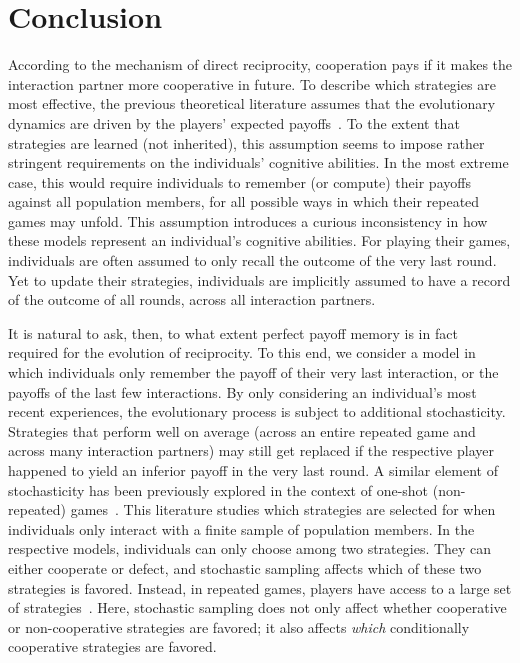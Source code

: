 \documentclass[11pt]{article}
\theoremstyle{plainCl1}
\theoremstyle{plainCl2}
\begin{document}


\section{Conclusion}\label{section:Conclusion}

According to the mechanism of direct reciprocity, cooperation pays if it makes the interaction partner more cooperative in future. 
To describe which strategies are most effective, the previous theoretical literature assumes that the evolutionary dynamics are driven by the players' expected payoffs~\citep{brauchli:JTB:1999,brandt:JTB:2006,ohtsuki:JTB:2007b,szolnoki:pre:2009b,imhof2010stochastic,van-segbroeck:prl:2012,grujic:jtb:2012,Martinez2012,stewart:pnas:2013,pinheiro:PLoSCB:2014,stewart:games:2015,Baek2016,McAvoy:ProcA:2019,glynatsi:SCR:2020,Schmid:PlosCB:2022,Murase:SciRep:2022}.
To the extent that strategies are learned (not inherited), this assumption seems to impose rather stringent requirements on the individuals' cognitive abilities. 
In the most extreme case, this would require individuals to remember (or compute) their payoffs against all population members, for all possible ways in which their repeated games may unfold. 
This assumption introduces a curious inconsistency in how these models represent an individual's cognitive abilities. 
For playing their games, individuals are often assumed to only recall the outcome of the very last round. 
Yet to update their strategies, individuals are implicitly assumed to have a record of the outcome of all rounds, across all interaction partners. 

It is natural to ask, then, to what extent perfect payoff memory is in fact required for the evolution of reciprocity. 
To this end, we consider a model in which individuals only remember the payoff of their very last interaction, or the payoffs of the last few interactions. 
By only considering an individual's most recent experiences, the evolutionary process is subject to additional stochasticity. 
Strategies that perform well on average (across an entire repeated game and across many interaction partners) may still get replaced if the respective player happened to yield an inferior payoff in the very last round. 
A similar element of stochasticity has been previously explored in the context of one-shot (non-repeated) games~\citep{sanchez:JTB:2005,roca:PhysicalReview:2006,Traulsen:JTB:2007,Woelfing:JTB:2009,Hauert:PRE:2018}. 
This literature studies which strategies are selected for when individuals only interact with a finite sample of population members. 
In the respective models, individuals can only choose among two strategies. 
They can either cooperate or defect, and stochastic sampling affects which of these two strategies is favored. 
Instead, in repeated games, players have access to a large set of strategies~\citep[in our case, all reactive strategies;][]{nowak:APC:1989}. 
Here, stochastic sampling does not only affect whether cooperative or non-cooperative strategies are favored; it also affects {\it which} conditionally cooperative strategies are favored. 
\end{document}
